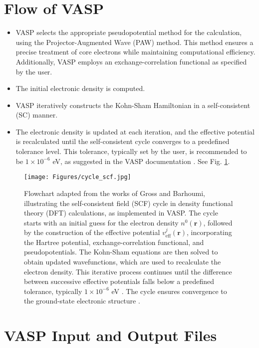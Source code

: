 \section{Flow of VASP}

\begin{itemize}
	\item VASP selects the appropriate pseudopotential method for the calculation, using the Projector-Augmented Wave (PAW) method. This method ensures a precise treatment of core electrons while maintaining computational efficiency. Additionally, VASP employs an exchange-correlation functional as specified by the user.
	\item The initial electronic density is computed.
	\item VASP iteratively constructs the Kohn-Sham Hamiltonian in a self-consistent (SC) manner.
	\item The electronic density is updated at each iteration, and the effective potential is recalculated until the self-consistent cycle converges to a predefined tolerance level. This tolerance, typically set by the user, is recommended to be $1 \times 10^{-6}$ eV, as suggested in the VASP documentation \supercite{EDIFF}. See Fig. \ref{fig:cycle_scf}.
\end{itemize}

\begin{figure}[H]
	\texttt{[image: Figures/cycle\_scf.jpg]}
	\centering
	\caption{Flowchart adapted from the works of Gross\supercite{Gross2003} and Barhoumi\supercite{barhoumi2021}, illustrating the self-consistent field (SCF) cycle in density functional theory (DFT) calculations, as implemented in VASP. The cycle starts with an initial guess for the electron density $n^{0}(\mathbf{r})$, followed by the construction of the effective potential $v^{j}_{\text{eff}}(\mathbf{r})$, incorporating the Hartree potential, exchange-correlation functional, and pseudopotentials. The Kohn-Sham equations are then solved to obtain updated wavefunctions, which are used to recalculate the electron density. This iterative process continues until the difference between successive effective potentials falls below a predefined tolerance, typically $1 \times 10^{-6}$ eV \supercite{EDIFF}. The cycle ensures convergence to the ground-state electronic structure \supercite{Kohn1965,blochl1994}.}
	\label{fig:cycle_scf}
\end{figure}
\section{VASP Input and Output Files}

